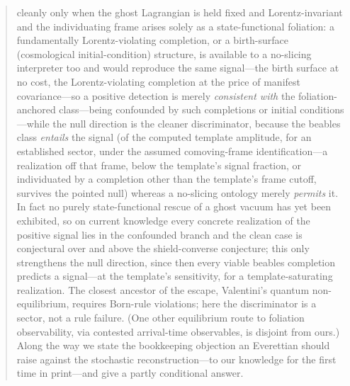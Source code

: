 \documentclass[11pt]{article}
\theoremstyle{remark}
\begin{document}
\begin{abstract}
cleanly only when the ghost Lagrangian is held fixed and
Lorentz-invariant and the individuating frame arises solely as a
state-functional foliation: a fundamentally Lorentz-violating
completion, or a birth-surface (cosmological initial-condition)
structure, is available to a no-slicing interpreter too and would
reproduce the same signal---the birth surface at no cost, the
Lorentz-violating completion at the price of manifest covariance---so
a positive detection is
merely \emph{consistent with} the foliation-anchored class---being
confounded by such completions or initial conditions---while the null
direction is the cleaner discriminator,
because the beables class \emph{entails} the signal (of the computed
template amplitude, for an established sector, under the assumed
comoving-frame identification---a realization off that frame, below
the template's signal fraction, or individuated by a completion other
than the template's frame cutoff, survives the pointed null) whereas a
no-slicing ontology merely \emph{permits} it. In fact no purely state-functional rescue of
a ghost vacuum has yet been exhibited, so on current knowledge every
concrete realization of the positive signal lies in the confounded
branch and the clean case is conjectural over and above the
shield-converse conjecture; this only strengthens the null direction,
since then every viable beables completion predicts a signal---at the
template's sensitivity, for a template-saturating realization. The
closest ancestor of the escape,
Valentini's quantum non-equilibrium, requires Born-rule violations;
here the discriminator is a sector, not a rule failure. (One other
equilibrium route to foliation observability, via contested
arrival-time observables, is disjoint from ours.) Along the way
we state the bookkeeping objection an Everettian should raise against
the stochastic reconstruction---to our knowledge for the first time in
print---and give a partly conditional answer.
\end{abstract}
\end{document}
